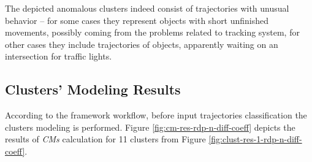 The depicted anomalous clusters indeed consist of trajectories with unusual behavior -- for some cases they represent objects with short unfinished movements, possibly coming from the problems related to tracking system, for other cases they include trajectories of objects, apparently waiting on an intersection for traffic lights.

\subsection{Clusters' Modeling Results}

According to the framework workflow, before input trajectories classification the clusters modeling is performed. Figure \ref{fig:cm-res-rdp-n-diff-coeff} depicts the results of \textit{CMs} calculation for 11 clusters from Figure \ref{fig:clust-res-1-rdp-n-diff-coeff}.

